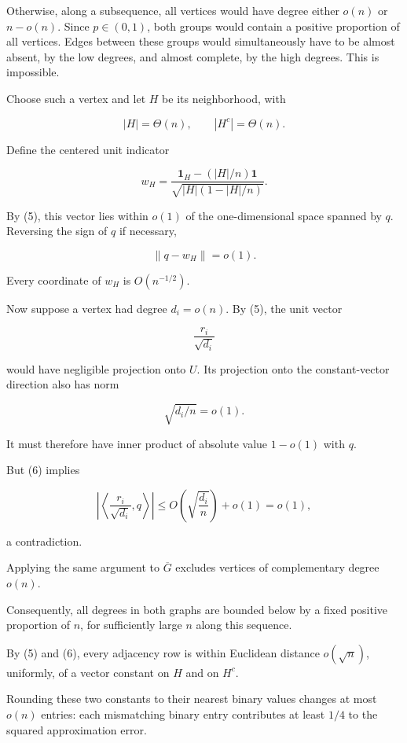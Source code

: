\documentclass[11pt]{article}
\begin{document}
Otherwise, along a subsequence, all vertices would have degree either \(o(n)\) or \(n-o(n)\). Since \(p\in(0,1)\), both groups would contain a positive proportion of all vertices. Edges between these groups would simultaneously have to be almost absent, by the low degrees, and almost complete, by the high degrees. This is impossible.

Choose such a vertex and let \(H\) be its neighborhood, with

\[
|H|=\Theta(n),
\qquad |H^c|=\Theta(n).
\]

Define the centered unit indicator

\[
w_H=
\frac{\mathbf1_H-(|H|/n)\mathbf1}
{\sqrt{|H|(1-|H|/n)}}.
\]

By (5), this vector lies within \(o(1)\) of the one-dimensional space spanned by \(q\). Reversing the sign of \(q\) if necessary,

\[
\|q-w_H\|=o(1).
\tag{6}
\]

Every coordinate of \(w_H\) is \(O(n^{-1/2})\).

Now suppose a vertex had degree \(d_i=o(n)\). By (5), the unit vector

\[
\frac{r_i}{\sqrt{d_i}}
\]

would have negligible projection onto \(U\). Its projection onto the constant-vector direction also has norm

\[
\sqrt{d_i/n}=o(1).
\]

It must therefore have inner product of absolute value \(1-o(1)\) with \(q\).

But (6) implies

\[
\left|
\left\langle
\frac{r_i}{\sqrt{d_i}},q
\right\rangle
\right|
\leq O\left(\sqrt{\frac{d_i}{n}}\right)+o(1)
=o(1),
\]

a contradiction.

Applying the same argument to \(\overline G\) excludes vertices of complementary degree \(o(n)\).

Consequently, all degrees in both graphs are bounded below by a fixed positive proportion of \(n\), for sufficiently large \(n\) along this sequence.

By (5) and (6), every adjacency row is within Euclidean distance \(o(\sqrt n)\), uniformly, of a vector constant on \(H\) and on \(H^c\).

Rounding these two constants to their nearest binary values changes at most \(o(n)\) entries: each mismatching binary entry contributes at least \(1/4\) to the squared approximation error.
\end{document}
